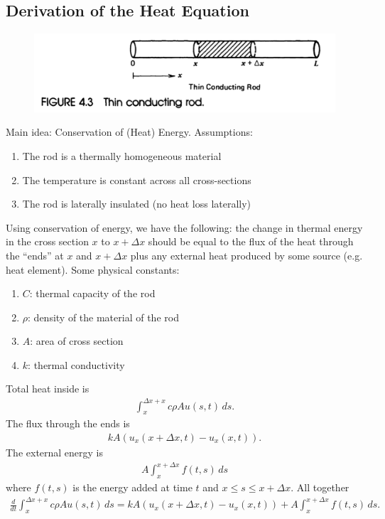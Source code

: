 \documentclass{article}
\theoremstyle{definition}
\begin{document}
\subsection{Derivation of the Heat Equation}
\begin{figure}[h!]
	\centering
	\includegraphics[scale=0.3]{heat.png}
\end{figure}
Main idea: Conservation of (Heat) Energy. Assumptions:
\begin{enumerate}
	\item The rod is a thermally homogeneous material 
	\item The temperature is constant across all cross-sections
	\item The rod is laterally insulated (no heat loss laterally)
\end{enumerate}
Using conservation of energy, we have the following: the change in thermal energy in the cross section $x$ to $x+\Delta x$ should be equal to the flux of the heat through the ``ends'' at $x$ and $x+\Delta x$ plus any external heat produced by some source (e.g. heat element). Some physical constants:
\begin{enumerate}
	\item $C$: thermal capacity of the rod
	\item $\rho$: density of the material of the rod
	\item $A$: area of cross section
	\item $k$: thermal conductivity
\end{enumerate}
Total heat inside is
\begin{align*}
\int_{x}^{\Delta x + x}c\rho A u(s,t)\,ds.
\end{align*}
The flux through the ends is
\begin{align*}
kA(u_x(x+\Delta x,t) - u_x(x, t)).
\end{align*}
The external energy is
\begin{align*}
A\int_x^{x+\Delta x}f(t,s)\,ds
\end{align*}
where $f(t,s)$ is the energy added at time $t$ and $x\leq s \leq x+\Delta x$. All together
\begin{align*}
\frac{d}{dt}\int_{x}^{\Delta x + x}c\rho A u(s,t)\,ds = kA(u_x(x+\Delta x,t) - u_x(x, t)) + A\int_x^{x+\Delta x}f(t,s)\,ds.
\end{align*}
\end{document}
